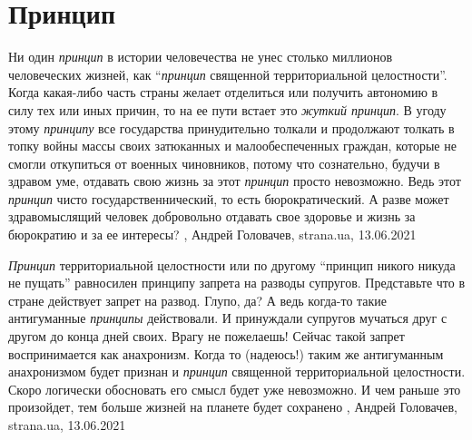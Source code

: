  
 
 
 
 
\chapter{Принцип}
\label{sec:slova.princip}

Ни один \emph{принцип} в истории человечества не унес столько миллионов
человеческих жизней, как \enquote{\emph{принцип} священной территориальной
целостности}. Когда какая-либо часть страны желает отделиться или получить
автономию в силу тех или иных причин, то на ее пути встает это \emph{жуткий
принцип}.  В угоду этому \emph{принципу} все государства принудительно толкали
и продолжают толкать в топку войны массы своих затюканных и малообеспеченных
граждан, которые не смогли откупиться от военных чиновников, потому что
сознательно, будучи в здравом уме, отдавать свою жизнь за этот \emph{принцип}
просто невозможно.  Ведь этот \emph{принцип} чисто государственнический, то
есть бюрократический. А разве может здравомыслящий человек добровольно отдавать
свое здоровье и жизнь за бюрократию и за ее интересы?
, 
Андрей Головачев, strana.ua, 13.06.2021

\emph{Принцип} территориальной целостности или по другому \enquote{принцип никого никуда не
пущать} равносилен принципу запрета на разводы супругов. Представьте что в
стране действует запрет на развод. Глупо, да? А ведь когда-то такие
антигуманные \emph{принципы} действовали. И принуждали супругов мучаться друг с другом
до конца дней своих. Врагу не пожелаешь! Сейчас такой запрет воспринимается как
анахронизм.  Когда то (надеюсь!) таким же антигуманным анахронизмом будет
признан и \emph{принцип} священной территориальной целостности. Скоро логически
обосновать его смысл будет уже невозможно. И чем раньше это произойдет, тем
больше жизней на планете будет сохранено
, 
Андрей Головачев, strana.ua, 13.06.2021

